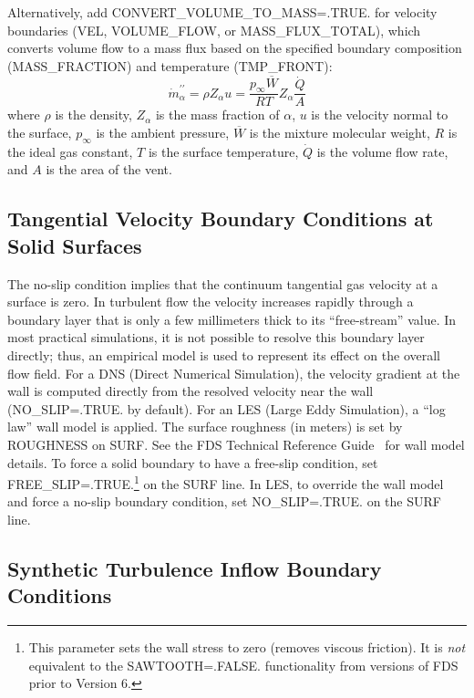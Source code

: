 \documentclass[11pt]{book}
\begin{document}
Alternatively, add {\ct CONVERT\_VOLUME\_TO\_MASS=.TRUE.} for velocity boundaries ({\ct VEL}, {\ct VOLUME\_FLOW}, or {\ct MASS\_FLUX\_TOTAL}), which converts volume flow to a mass flux based on the specified boundary composition ({\ct MASS\_FRACTION}) and temperature ({\ct TMP\_FRONT}):
\begin{equation}
\dot{m}_\alpha^{\prime\prime} = \rho Z_\alpha u = \frac{p_\infty \overline{W}}{R T} Z_\alpha \frac{\dot{Q}}{A}
\end{equation}
where $\rho$ is the density, $Z_\alpha$ is the mass fraction of $\alpha$, $u$ is the velocity normal to the surface, $p_\infty$ is the ambient pressure, $\overline{W}$ is the mixture molecular weight, $R$ is the ideal gas constant, $T$ is the surface temperature, $\dot{Q}$ is the volume flow rate, and $A$ is the area of the vent.

\subsection{Tangential Velocity Boundary Conditions at Solid Surfaces}
\label{info:WALL_MODEL}

The no-slip condition implies that the continuum tangential gas velocity at a surface is zero.
In turbulent flow the velocity increases rapidly through a boundary layer that is only a few millimeters thick to its ``free-stream'' value.
In most practical simulations, it is not possible to resolve this boundary layer directly; thus, an empirical model is used to represent its effect on the overall flow field. For a DNS (Direct Numerical Simulation), the velocity gradient at the wall is computed directly from the resolved velocity near the wall ({\ct NO\_SLIP=.TRUE.} by default). For an LES (Large Eddy Simulation), a ``log law'' wall model is applied. The surface roughness (in meters) is set by {\ct ROUGHNESS} on {\ct SURF}. See the FDS Technical Reference Guide~\cite{FDS_Math_Guide} for wall model details. To force a solid boundary to have a free-slip condition, set {\ct FREE\_SLIP=.TRUE.}\footnote{This parameter sets the wall stress to zero (removes viscous friction).  It is \emph{not} equivalent to the {\ct SAWTOOTH=.FALSE.} functionality from versions of FDS prior to Version 6.} on the {\ct SURF} line. In LES, to override the wall model and force a no-slip boundary condition, set {\ct NO\_SLIP=.TRUE.} on the {\ct SURF} line.


\subsection{Synthetic Turbulence Inflow Boundary Conditions}
\label{info:synthetic_turbulence}
\end{document}
